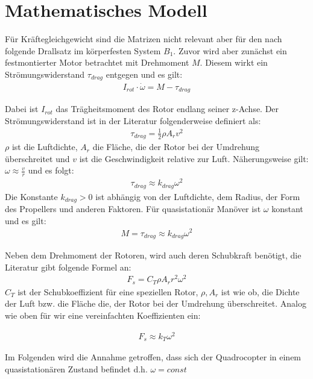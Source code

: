 \section{Mathematisches Modell}
Für Kräftegleichgewicht sind die Matrizen nicht relevant aber für den nach folgende Drallsatz im körperfesten System $B_1$. %
Zuvor wird aber zunächst ein festmontierter Motor betrachtet mit Drehmoment $M$. Diesem wirkt ein Strömungswiderstand $\tau_{drag}$ entgegen und es gilt: 
\begin{align}
{I_{rot}} \cdot \dot{\omega}  = M - \tau_{drag} 
\end{align}

Dabei ist $I_{rot}$ das Trägheitsmoment des Rotor endlang seiner z-Achse. Der Strömungswiderstand ist in der Literatur folgenderweise definiert als:
\begin{align}
    \tau_{drag} = \frac{1}{2} \rho A_r v^2
\end{align}
$\rho$ ist die Luftdichte, $A_r$ die Fläche, die der Rotor bei der Umdrehung überschreitet und $v$ ist die Geschwindigkeit relative zur Luft. Näherungsweise gilt: $\omega \approx \frac{v}{r}$ und es folgt:
\begin{align}
    \tau_{drag} \approx k_{drag} \omega^2
\end{align}
Die Konstante $k_{drag} > 0$ ist abhängig von der Luftdichte, dem Radius, der Form des Propellers und anderen Faktoren. Für quasistationär Manöver ist $\omega$ konstant und es gilt: 
\begin{align}
    M = \tau_{drag} \approx k_{drag} \omega^2 \label{gl:MDrag}
\end{align}

Neben dem Drehmoment der Rotoren, wird auch deren Schubkraft benötigt, die Literatur gibt folgende Formel an:
\begin{align}
    F_s = C_T \rho A_r r^2 \omega^2 
\end{align}
$C_T$ ist der Schubkoeffizient für eine speziellen Rotor, $\rho, A_r$ ist wie ob, die Dichte der Luft bzw. die Fläche die, der Rotor bei der Umdrehung überschreitet. Analog wie oben für wir eine vereinfachten Koeffizienten ein:

\begin{align}
    F_s \approx k_{T} \omega^2 \label{gl:schub}
\end{align}

Im Folgenden wird die Annahme getroffen, dass sich der Quadrocopter in einem quasistationären Zustand befindet d.h. $\omega = const$\\

